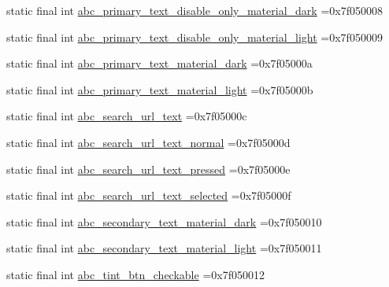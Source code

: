 \begin{DoxyCompactItemize}
\item 
static final int \mbox{\hyperlink{classbr_1_1unb_1_1cic_1_1mp_1_1marketmaster_1_1R_1_1color_a2fd3422fe1a863333bd0835b6d9c34e0}{abc\+\_\+primary\+\_\+text\+\_\+disable\+\_\+only\+\_\+material\+\_\+dark}} =0x7f050008
\item 
static final int \mbox{\hyperlink{classbr_1_1unb_1_1cic_1_1mp_1_1marketmaster_1_1R_1_1color_a680fb58ca5c338b69fdb653d89b55665}{abc\+\_\+primary\+\_\+text\+\_\+disable\+\_\+only\+\_\+material\+\_\+light}} =0x7f050009
\item 
static final int \mbox{\hyperlink{classbr_1_1unb_1_1cic_1_1mp_1_1marketmaster_1_1R_1_1color_abd7842438183fb999a821a6ce0006e41}{abc\+\_\+primary\+\_\+text\+\_\+material\+\_\+dark}} =0x7f05000a
\item 
static final int \mbox{\hyperlink{classbr_1_1unb_1_1cic_1_1mp_1_1marketmaster_1_1R_1_1color_a1c26a7c86275ac895bf3fe96f2deaa7b}{abc\+\_\+primary\+\_\+text\+\_\+material\+\_\+light}} =0x7f05000b
\item 
static final int \mbox{\hyperlink{classbr_1_1unb_1_1cic_1_1mp_1_1marketmaster_1_1R_1_1color_a35a37b12ceadf007f38aa3d38ea7c1f4}{abc\+\_\+search\+\_\+url\+\_\+text}} =0x7f05000c
\item 
static final int \mbox{\hyperlink{classbr_1_1unb_1_1cic_1_1mp_1_1marketmaster_1_1R_1_1color_a6b6940e7371279e667d7b8405667499f}{abc\+\_\+search\+\_\+url\+\_\+text\+\_\+normal}} =0x7f05000d
\item 
static final int \mbox{\hyperlink{classbr_1_1unb_1_1cic_1_1mp_1_1marketmaster_1_1R_1_1color_a34ff2b654f4e3601c8ae8240fc19aa76}{abc\+\_\+search\+\_\+url\+\_\+text\+\_\+pressed}} =0x7f05000e
\item 
static final int \mbox{\hyperlink{classbr_1_1unb_1_1cic_1_1mp_1_1marketmaster_1_1R_1_1color_aef2db997e7d2587f962edba86c685ab7}{abc\+\_\+search\+\_\+url\+\_\+text\+\_\+selected}} =0x7f05000f
\item 
static final int \mbox{\hyperlink{classbr_1_1unb_1_1cic_1_1mp_1_1marketmaster_1_1R_1_1color_ab3152d081a3ff03c583c25b3107a1cd3}{abc\+\_\+secondary\+\_\+text\+\_\+material\+\_\+dark}} =0x7f050010
\item 
static final int \mbox{\hyperlink{classbr_1_1unb_1_1cic_1_1mp_1_1marketmaster_1_1R_1_1color_a2a8f2d51c8b2917b9cb1fbdb3cda0df9}{abc\+\_\+secondary\+\_\+text\+\_\+material\+\_\+light}} =0x7f050011
\item 
static final int \mbox{\hyperlink{classbr_1_1unb_1_1cic_1_1mp_1_1marketmaster_1_1R_1_1color_af190bf1ce6e18e9a55af43f9b6595a62}{abc\+\_\+tint\+\_\+btn\+\_\+checkable}} =0x7f050012

\end{DoxyCompactItemize}
